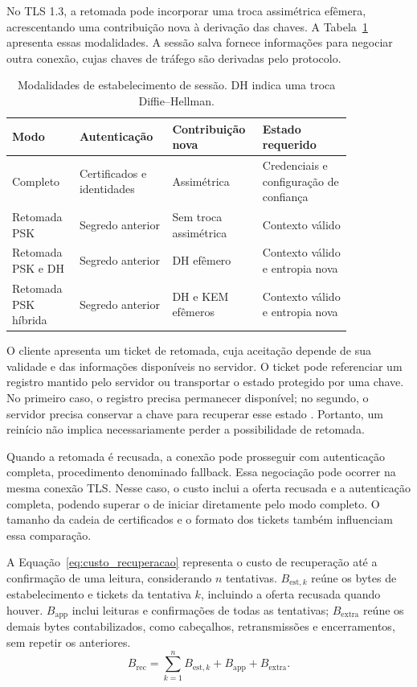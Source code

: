 No TLS 1.3, a retomada pode incorporar uma troca assimétrica efêmera, acrescentando uma contribuição nova à derivação das chaves. A Tabela~\ref{tab:modos_sessao} apresenta essas modalidades. A sessão salva fornece informações para negociar outra conexão, cujas chaves de tráfego são derivadas pelo protocolo.

\begin{table}[!htb]
\centering
\small
\begin{tabular}{|>{\raggedright\arraybackslash}p{0.18\linewidth}|>{\raggedright\arraybackslash}p{0.24\linewidth}|>{\raggedright\arraybackslash}p{0.18\linewidth}|>{\raggedright\arraybackslash}p{0.24\linewidth}|}
\hline
\textbf{Modo} & \textbf{Autenticação} & \textbf{Contribuição nova} & \textbf{Estado requerido} \\
\hline
Completo & Certificados e identidades & Assimétrica & Credenciais e configuração de confiança \\
\hline
Retomada PSK & Segredo anterior & Sem troca assimétrica & Contexto válido \\
\hline
Retomada PSK e DH & Segredo anterior & DH efêmero & Contexto válido e entropia nova \\
\hline
Retomada PSK híbrida & Segredo anterior & DH e KEM efêmeros & Contexto válido e entropia nova \\
\hline
\end{tabular}
\caption{Modalidades de estabelecimento de sessão. DH indica uma troca Diffie--Hellman.}
\label{tab:modos_sessao}
\end{table}

O cliente apresenta um ticket de retomada, cuja aceitação depende de sua validade e das informações disponíveis no servidor. O ticket pode referenciar um registro mantido pelo servidor ou transportar o estado protegido por uma chave. No primeiro caso, o registro precisa permanecer disponível; no segundo, o servidor precisa conservar a chave para recuperar esse estado \cite{hebrok2023tickets}. Portanto, um reinício não implica necessariamente perder a possibilidade de retomada.

Quando a retomada é recusada, a conexão pode prosseguir com autenticação completa, procedimento denominado fallback. Essa negociação pode ocorrer na mesma conexão TLS. Nesse caso, o custo inclui a oferta recusada e a autenticação completa, podendo superar o de iniciar diretamente pelo modo completo. O tamanho da cadeia de certificados e o formato dos tickets também influenciam essa comparação.

A Equação~\ref{eq:custo_recuperacao} representa o custo de recuperação até a confirmação de uma leitura, considerando \(n\) tentativas. \(B_{\mathrm{est},k}\) reúne os bytes de estabelecimento e tickets da tentativa \(k\), incluindo a oferta recusada quando houver. \(B_{\mathrm{app}}\) inclui leituras e confirmações de todas as tentativas; \(B_{\mathrm{extra}}\) reúne os demais bytes contabilizados, como cabeçalhos, retransmissões e encerramentos, sem repetir os anteriores.
\begin{equation}
B_{\mathrm{rec}}=\sum_{k=1}^{n}B_{\mathrm{est},k}+B_{\mathrm{app}}+B_{\mathrm{extra}}.
\label{eq:custo_recuperacao}
\end{equation}

